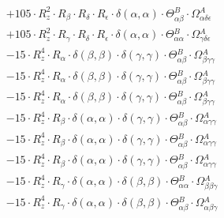 \documentclass{article}
\begin{document}
\begin{subequations}
\begin{gather}
\begin{array}{c}
 \\[0.2em] 		 + 105 \cdot R_{z}^{2} \cdot R_{\beta{}} \cdot R_{\delta{}} \cdot R_{\epsilon{}} \cdot \delta{}\left(\alpha{}, \alpha{}\right) \cdot \Theta{}^{B}_{\alpha{}\beta{}} \cdot \Omega{}^{A}_{\alpha{}\delta{}\epsilon{}} 
 \\[0.2em] 		 + 105 \cdot R_{z}^{2} \cdot R_{\gamma{}} \cdot R_{\delta{}} \cdot R_{\epsilon{}} \cdot \delta{}\left(\alpha{}, \alpha{}\right) \cdot \Theta{}^{B}_{\alpha{}\alpha{}} \cdot \Omega{}^{A}_{\gamma{}\delta{}\epsilon{}} 
 \\[0.2em] 		 - 15 \cdot R_{z}^{4} \cdot R_{\alpha{}} \cdot \delta{}\left(\beta{}, \beta{}\right) \cdot \delta{}\left(\gamma{}, \gamma{}\right) \cdot \Theta{}^{B}_{\alpha{}\beta{}} \cdot \Omega{}^{A}_{\beta{}\gamma{}\gamma{}} 
 \\[0.2em] 		 - 15 \cdot R_{z}^{4} \cdot R_{\alpha{}} \cdot \delta{}\left(\beta{}, \beta{}\right) \cdot \delta{}\left(\gamma{}, \gamma{}\right) \cdot \Theta{}^{B}_{\alpha{}\beta{}} \cdot \Omega{}^{A}_{\beta{}\gamma{}\gamma{}} 
 \\[0.2em] 		 - 15 \cdot R_{z}^{4} \cdot R_{\alpha{}} \cdot \delta{}\left(\beta{}, \beta{}\right) \cdot \delta{}\left(\gamma{}, \gamma{}\right) \cdot \Theta{}^{B}_{\alpha{}\beta{}} \cdot \Omega{}^{A}_{\beta{}\gamma{}\gamma{}} 
 \\[0.2em] 		 - 15 \cdot R_{z}^{4} \cdot R_{\beta{}} \cdot \delta{}\left(\alpha{}, \alpha{}\right) \cdot \delta{}\left(\gamma{}, \gamma{}\right) \cdot \Theta{}^{B}_{\alpha{}\beta{}} \cdot \Omega{}^{A}_{\alpha{}\gamma{}\gamma{}} 
 \\[0.2em] 		 - 15 \cdot R_{z}^{4} \cdot R_{\beta{}} \cdot \delta{}\left(\alpha{}, \alpha{}\right) \cdot \delta{}\left(\gamma{}, \gamma{}\right) \cdot \Theta{}^{B}_{\alpha{}\beta{}} \cdot \Omega{}^{A}_{\alpha{}\gamma{}\gamma{}} 
 \\[0.2em] 		 - 15 \cdot R_{z}^{4} \cdot R_{\beta{}} \cdot \delta{}\left(\alpha{}, \alpha{}\right) \cdot \delta{}\left(\gamma{}, \gamma{}\right) \cdot \Theta{}^{B}_{\alpha{}\beta{}} \cdot \Omega{}^{A}_{\alpha{}\gamma{}\gamma{}} 
 \\[0.2em] 		 - 15 \cdot R_{z}^{4} \cdot R_{\gamma{}} \cdot \delta{}\left(\alpha{}, \alpha{}\right) \cdot \delta{}\left(\beta{}, \beta{}\right) \cdot \Theta{}^{B}_{\alpha{}\alpha{}} \cdot \Omega{}^{A}_{\beta{}\beta{}\gamma{}} 
 \\[0.2em] 		 - 15 \cdot R_{z}^{4} \cdot R_{\gamma{}} \cdot \delta{}\left(\alpha{}, \alpha{}\right) \cdot \delta{}\left(\beta{}, \beta{}\right) \cdot \Theta{}^{B}_{\alpha{}\beta{}} \cdot \Omega{}^{A}_{\alpha{}\beta{}\gamma{}} 

\end{array}
\end{gather}
\end{subequations}
\end{document}

